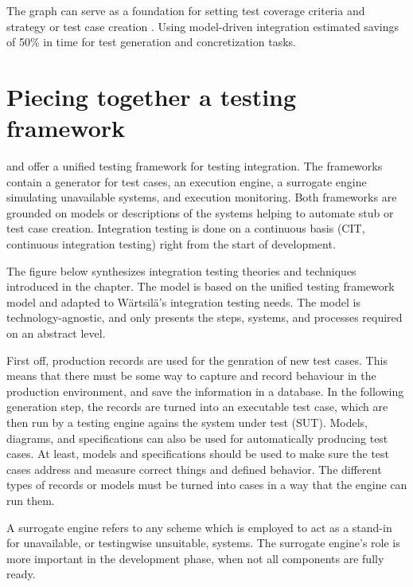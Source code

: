 \documentclass[12pt,a4paper,oneside,pdftex]{report}
\begin{document}
{{{The graph can serve as a foundation for setting test coverage criteria and strategy or test case creation 
\citep{benz2007combining, hura2011method, linnenkugel1990test}. Using model-driven integration \citet{wieczorek2010model} estimated savings of 50\% in time for test generation and concretization tasks.

\chapter{Piecing together a testing framework}
\label{chapter:framework}

\citet{huang2008surrogate} and \citet{liu2009unified} offer a unified testing framework for testing integration. The 
frameworks contain a generator for test cases, an execution engine, a surrogate engine 
simulating unavailable systems, and execution monitoring. Both frameworks are grounded on models or descriptions of the systems helping to automate stub or test case creation. Integration testing is done on a continuous basis (CIT, continuous integration testing) right from the start of development.

The figure below synthesizes integration testing theories and techniques introduced in the chapter. The model is based on the \citet{liu2009unified} unified testing framework model and adapted to Wärtsilä's integration testing needs. The model is technology-agnostic, and only presents the steps, systems, and processes required on an abstract level.

First off, production records are used for the genration of new test cases. This means that there must be some way to capture and record behaviour in the production environment, and save the information in a database. In the following generation step, the records are turned into an executable test case, which are then run by a testing engine agains the system under test (SUT). Models, diagrams, and specifications can also be used for automatically producing test cases. At least, models and specifications should be used to make sure the test cases address and measure correct things and defined behavior. The different types of records or models must be turned into cases in a way that the engine can run them. 

A surrogate engine refers to any scheme which is employed to act as a stand-in for unavailable, or testingwise unsuitable, systems. The surrogate engine's role is more important in the development phase, when not all components are fully ready.

}}}
\end{document}
